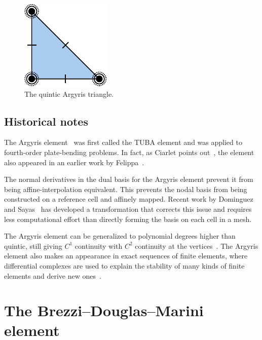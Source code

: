\begin{figure}[h]
  \begin{center}
    \includegraphics[width=\smallfig]{chapters/kirby-6/pdf/ARG5.pdf}
    \caption{The quintic Argyris triangle.}
  \end{center}
\end{figure}

\subsection{Historical notes}

The Argyris element~\cite{ArgyrisFriedScharpf1968} was first called the
TUBA element and was applied to fourth-order plate-bending problems.
In fact, as Ciarlet points out~\cite{Ciarlet2002}, the element also
appeared in an earlier work by Felippa~\cite{Felippa1966}.

The normal derivatives in the dual basis for the Argyris element
prevent it from being affine-interpolation equivalent. This prevents
the nodal basis from being constructed on a reference cell and
affinely mapped. Recent work by Dominguez and
Sayas~\cite{DominguezSayas2008} has developed a transformation that
corrects this issue and requires less computational effort than
directly forming the basis on each cell in a mesh.

The Argyris element can be generalized to polynomial degrees higher
than quintic, still giving \( C^1 \) continuity with \( C^2 \)
continuity at the vertices~\cite{vSolinSegethDolevzel2004}. The Argyris
element also makes an appearance in exact sequences of finite
elements, where differential complexes are used to explain the
stability of many kinds of finite elements and derive new
ones~\cite{ArnoldFalkWinther2006d}.

\newpage

\section{The Brezzi--Douglas--Marini element}

